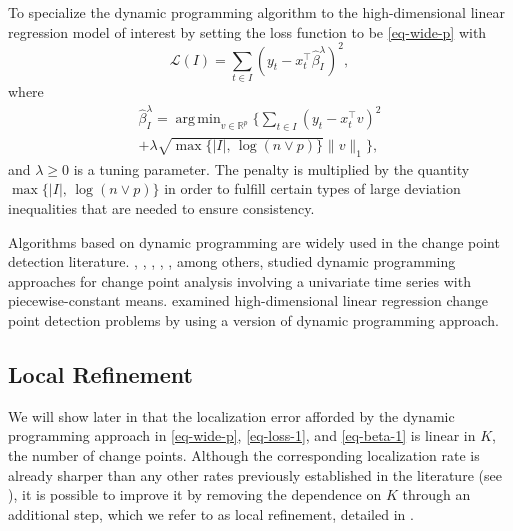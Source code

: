\documentclass[twoside]{article}
\DeclareMathOperator*{\argmin}{arg\,min}
\begin{document}
To specialize the dynamic programming algorithm to the  high-dimensional linear regression model of interest  by setting the loss function to be
\eqref{eq-wide-p} with
	\begin{equation}\label{eq-loss-1}
		\mathcal L(I) = \sum_{t \in I}(y_t - x_t^{\top} \widehat \beta^\lambda_I)^2,
	\end{equation}
	where
	\begin{align}
		\widehat \beta^\lambda_I = \argmin_{v \in \mathbb R^p} \bigg\{\sum_{t \in I} (y_t - x_t^{\top}v)^2  \nonumber \\
		+ \lambda \sqrt{\max\{|I|, \, \log(n \vee p)\}} \| v\|_1\bigg\},\label{eq-beta-1}
	\end{align}
	and $\lambda \geq 0$ is a tuning parameter.  The penalty is multiplied by the quantity $\max\{|I|, \, \log(n \vee p)\}$ in order to fulfill certain types of large deviation inequalities that are needed to ensure consistency.  %
	

Algorithms based on dynamic programming are widely used in the change point detection literature.  \cite{FriedrichEtal2008}, \cite{KillickEtal2012}, \cite{Rigaill2010}, \cite{MaidstoneEtal2017}, \cite{wang2018univariate}, among others, studied dynamic programming approaches for change point analysis involving a univariate time series with piecewise-constant means. \cite{leonardi2016computationally} examined high-dimensional linear regression change point detection problems by using a version of dynamic programming approach. 
	

\subsection{Local Refinement}\label{sec-lr}

We will show later in  that the localization error afforded by the dynamic programming approach in \eqref{eq-wide-p}, \eqref{eq-loss-1}, and \eqref{eq-beta-1} is linear in $K$, the number of change points.  Although the corresponding localization rate is already sharper than any other rates previously established in the literature (see ), it is possible to improve it by removing the dependence on $K$ through an additional step, which we refer to as local refinement, detailed in .
\end{document}
